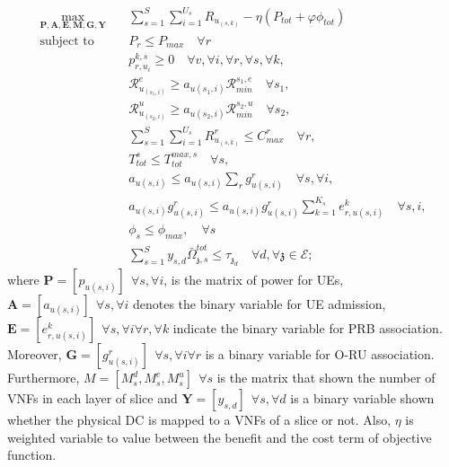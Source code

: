 \documentclass[conference]{IEEEtran}
\begin{document}
\begin{subequations}
\begin{alignat}{4}
\max\limits_{\boldsymbol{P}, \boldsymbol{A}, \boldsymbol{E}, \boldsymbol{M}, \boldsymbol{G}, \boldsymbol{Y} }   \quad &  \sum_{s=1}^{S}\sum_{i=1}^{U_s}R_{u_{(s,k)}}- \eta(P_{tot}+ \varphi \phi_{tot}) \ \\
\text{subject to} \quad  &  P_r \leq P_{max} \quad \forall r
 \label{c11} \\
&p_{r,u_i}^{k,s}  \geq 0  \quad \forall v,\forall i,\forall r,\forall s, \forall k,\label{c12} \\
&\mathcal{R}_{u_{(s_1,i)}}^e \geq  a_{u(s_1,i)}\mathcal{R}_{min}^{s_1,e} \quad \forall s_1, \label{c13} \\
&\mathcal{R}_{u_{(s_2,i)}}^u \geq  a_{u(s_2,i)}\mathcal{R}_{min}^{s_2,u} \quad \forall s_2, \label{c14} \\
& \sum_{s=1}^{S}\sum_{i=1}^{U_s}R_{u_{(s,k)}}^r \leq C_{max}^r \quad \forall r, \label{c15}\\ 
&T_{tot}^s \leq T_{tot}^{max,s} \quad \forall s,\label{c16} \\
&a_{u(s,i)} \leq a_{u(s,i)}\sum_{r}g^r_{u(s,i)}  \quad \forall s,\forall i, \label{c17}  \\
& a_{u(s,i)}g^r_{u(s,i)} \leq a_{u(s,i)}g^r_{u(s,i)}\sum_{k =1}^{K_s} e^{k}_{r,u(s,i)}  \quad \forall s,i , \label{c18} \\
& \phi_{s} \leq \phi_{max}, \quad \forall s \label{c19} \\
 &\textstyle \sum_{s=1}^{S} y_{s,d} \bar{\Omega}_{\mathfrak{z},s}^{tot}  \leq   \tau_{\mathfrak{z}_d} 
 \quad \forall d, \forall \mathfrak{z}\in \mathcal{E}; \label{c20}
\end{alignat}
\label{constraints}
\end{subequations}
where $\boldsymbol{P} =[p_{u(s,i)}] \:\: \forall s , \forall i $, is the matrix of power for UEs, $\boldsymbol{A} =[a_{u(s,i)}] \:\: \forall s , \forall i $ denotes the binary variable for UE admission,
$\boldsymbol{E} =[e_{r,u(s,i)}^k] \:\: \forall s , \forall i \forall r, \forall k$ indicate the binary variable for PRB association. Moreover, $\boldsymbol{G} =[g_{u(s,i)}^r] \:\: \forall s , \forall i \forall r$ is a binary variable for O-RU association. Furthermore, $M = [M_s^d, M_s^c, M_s^u] \:\: \forall s$ is the matrix that shown the number of VNFs in each layer of slice and $\boldsymbol{Y} =[y_{s,d}]  \:\: \forall s ,  \forall d $ is a binary variable shown whether
the physical DC is mapped to a VNFs of a slice or not.
Also, $\eta$ is weighted variable to value between the benefit and the cost term of objective function.
\end{document}
